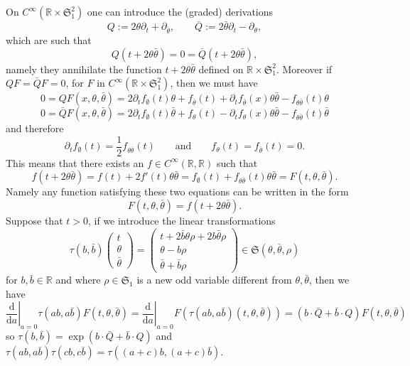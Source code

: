 \documentclass[a4paper,10pt]{article}
\newcommand{\assign}{:=}
\newcommand{\mathd}{\mathrm{d}}
\begin{document}
On $C^{\infty} (\mathbb{R} \times \mathfrak{S}^2_1)$ one can introduce the
(graded) derivations
\[ Q \assign 2 \theta \partial_t + \partial_{\bar{\theta}}, \qquad \bar{Q}
   \assign 2 \bar{\theta} \partial_t - \partial_{\theta}, \]
which are such that
\[ Q (t + 2 \theta \bar{\theta}) = 0 = \bar{Q} (t + 2 \theta \bar{\theta}), \]
namely they annihilate the function $t + 2 \theta \bar{\theta}$ defined on
$\mathbb{R} \times \mathfrak{S}^2_1$. Moreover if $Q F = \bar{Q} F = 0$, for
$F$ in $C^{\infty} (\mathbb{R} \times \mathfrak{S}^2_1)$, then we must have
\[ 0 = Q F (x, \theta, \bar{\theta}) = 2 \partial_t f_{\emptyset} (t) \theta +
   f_{\bar{\theta}} (t) + \partial_t f_{\bar{\theta}} (x) \theta \bar{\theta}
   - f_{\theta \bar{\theta}} (t) \theta \]
\[ 0 = \bar{Q} F (x, \theta, \bar{\theta}) = 2 \partial_t f_{\emptyset} (t)
   \bar{\theta} + f_{\theta} (t) - \partial_t f_{\theta} (x) \theta
   \bar{\theta} - f_{\theta \bar{\theta}} (t) \bar{\theta} \]
and therefore
\[ \partial_t f_{\emptyset} (t) = \frac{1}{2} f_{\theta \bar{\theta}} (t)
   \qquad \text{and} \qquad f_{\theta} (t) = f_{\bar{\theta}} (t) = 0. \]
This means that there exists an $f \in C^{\infty} (\mathbb{R}, \mathbb{R})$
such that
\[ f (t + 2 \theta \bar{\theta}) = f (t) + 2 f' (t) \theta \bar{\theta} =
   f_{\emptyset} (t) + f_{\theta \bar{\theta}} (t) \theta \bar{\theta} = F (t,
   \theta, \bar{\theta}) . \]
Namely any function satisfying these two equations can be written in the form
\[ F (t, \theta, \bar{\theta}) = f (t + 2 \theta \bar{\theta}) . \]
Suppose that $t > 0$, if we introduce the linear transformations
\[ \tau (b, \bar{b}) \left(\begin{array}{c}
     t\\
     \theta\\
     \bar{\theta}
   \end{array}\right) = \left(\begin{array}{c}
     t + 2 \bar{b} \theta \rho + 2 b \bar{\theta} \rho\\
     \theta - b \rho\\
     \bar{\theta} + \bar{b} \rho
   \end{array}\right) \in \mathfrak{S} (\theta, \bar{\theta}, \rho) \]
for $b, \bar{b} \in \mathbb{R}$ and where $\rho \in \mathfrak{S}_1$ is a new
odd variable different from $\theta, \bar{\theta}$, then we have
\[ \left. \frac{\mathd}{\mathd a} \right|_{a = 0} \tau (a b, a \bar{b}) F (t,
   \theta, \bar{\theta}) = \left. \frac{\mathd}{\mathd a} \right|_{a = 0} F
   (\tau (a b, a \bar{b}) (t, \theta, \bar{\theta})) = (b \cdot \bar{Q} +
   \bar{b} \cdot Q) F (t, \theta, \bar{\theta}) \]
so $\tau (b, \bar{b}) = \exp (b \cdot \bar{Q} + \bar{b} \cdot Q)$ and $\tau (a
b, a \bar{b}) \tau (c b, c \bar{b}) = \tau ((a + c) b, (a + c) \bar{b})$.
\end{document}
